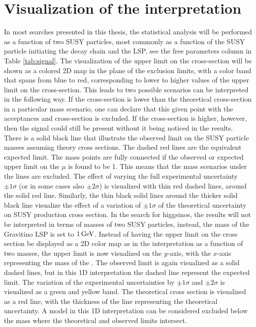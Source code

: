 \section{Visualization of the interpretation}
\noindent\justify
In most searches presented in this thesis, the statistical analysis will be performed as a function of two SUSY particles, most commonly as a function of the SUSY particle initiating the decay chain and the LSP, see the free parameters column in Table \ref{tab:signal}. 
The visualization of the upper limit on the cross-section will be shown as a colored 2D map in the plane of the exclusion limits, with a color band that spans from blue to red, corresponding to lower to higher values of the upper limit on the cross-section.  
This leads to two possible scenarios can be interpreted in the following way.  
If the cross-section is lower than the theoretical cross-section in a particular mass scenario, one can declare that this given point with the acceptances and cross-section is excluded.
If the cross-section is higher, however, then the signal could still be present without it being noticed in the results.
There is a solid black line that illustrate the observed limit on the SUSY particle masses assuming theory cross sections.
The dashed red lines are the equivalent expected limit.
The mass points are fully connected if the observed or expected upper limit on the $\mu$ is found to be 1.
This means that the mass scenarios under the lines are excluded.
The effect of varying the full experimental uncertainty $\pm 1 \sigma$  (or in some cases also $\pm 2 \sigma$) is visualized with thin red dashed lines, around the solid red line.
Similarly, the thin black solid lines around the thicker solid black line visualize the effect of a variation of $\pm 1 \sigma$ of the theoretical uncertainty on SUSY production cross section.
\newpara
\noindent\justify
In the search for higgsinos, the results will not be interpreted in terms of masses of two SUSY particles, instead, the mass of the Gravitino LSP is set to $1\,\text{Ge\hspace{-.08em}V}$.  
Instead of having the upper limit on the cross section be displayed as a 2D color map as in the interpretation as a function of two masses, the upper limit is now visualized on the $y$-axis, with the $x$-axis representing the mass of the \firstchi. 
The observed limit is again visualized as a solid dashed lines, but in this 1D interpretation the dashed line represent the expected limit. 
The variation of the experimental uncertainties by $\pm 1 \sigma$ and $\pm 2 \sigma$ is visualized as a green and yellow band. 
The theoretical cross section is visualized as a red line, with the thickness of the line representing the theoretical uncertainty. 
A model in this 1D interpretation can be considered excluded below the mass where the theoretical and observed limits intersect. 
 
